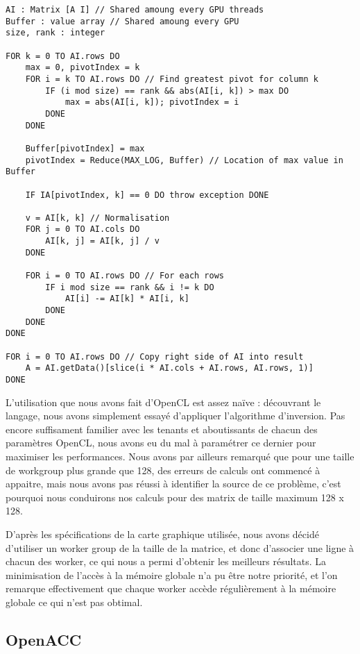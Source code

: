 \documentclass[a4paper, french]{article}
\begin{document}
\begin{lstlisting}[style=txt]
AI : Matrix [A I] // Shared amoung every GPU threads
Buffer : value array // Shared amoung every GPU
size, rank : integer

FOR k = 0 TO AI.rows DO
    max = 0, pivotIndex = k
    FOR i = k TO AI.rows DO // Find greatest pivot for column k
        IF (i mod size) == rank && abs(AI[i, k]) > max DO
            max = abs(AI[i, k]); pivotIndex = i
        DONE
    DONE

    Buffer[pivotIndex] = max
    pivotIndex = Reduce(MAX_LOG, Buffer) // Location of max value in Buffer

    IF IA[pivotIndex, k] == 0 DO throw exception DONE

    v = AI[k, k] // Normalisation
    FOR j = 0 TO AI.cols DO
        AI[k, j] = AI[k, j] / v
    DONE

    FOR i = 0 TO AI.rows DO // For each rows
        IF i mod size == rank && i != k DO
            AI[i] -= AI[k] * AI[i, k]
        DONE
    DONE
DONE

FOR i = 0 TO AI.rows DO // Copy right side of AI into result
    A = AI.getData()[slice(i * AI.cols + AI.rows, AI.rows, 1)]
DONE
\end{lstlisting}

L'utilisation que nous avons fait d'OpenCL est assez naïve : découvrant le langage, nous avons simplement essayé d'appliquer l'algorithme d'inversion. Pas encore suffisament familier avec les tenants et aboutissants de chacun des paramètres OpenCL, nous avons eu du mal à paramétrer ce dernier pour maximiser les performances. Nous avons par ailleurs remarqué que pour une taille de workgroup plus grande que 128, des erreurs de calculs ont commencé à appaitre, mais nous avons pas réussi à identifier la source de ce problème, c'est pourquoi nous conduirons nos calculs pour des matrix de taille maximum 128 x 128.

D'après les spécifications de la carte graphique utilisée, nous avons décidé d'utiliser un worker group de la taille de la matrice, et donc d'associer une ligne à chacun des worker, ce qui nous a permi d'obtenir les meilleurs résultats. La minimisation de l'accès à la mémoire globale n'a pu être notre priorité, et l'on remarque effectivement que chaque worker accède régulièrement à la mémoire globale ce qui n'est pas obtimal.

\subsection{OpenACC}
\end{document}
